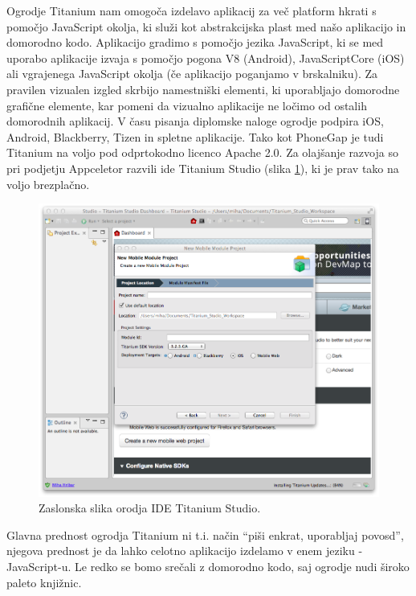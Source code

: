 Ogrodje Titanium\cite{titanium} nam omogoča izdelavo aplikacij za več platform hkrati s pomočjo JavaScript okolja, ki služi kot abstrakcijska plast med našo aplikacijo in domorodno kodo. Aplikacijo gradimo s pomočjo jezika JavaScript, ki se med uporabo aplikacije izvaja s pomočjo pogona V8\cite{v8} (Android), JavaScriptCore (iOS)\cite{javascriptcore} ali vgrajenega JavaScript okolja (če aplikacijo poganjamo v brskalniku). Za pravilen vizualen izgled skrbijo namestniški elementi, ki uporabljajo domorodne grafične elemente, kar pomeni da vizualno aplikacije ne ločimo od ostalih domorodnih aplikacij. V času pisanja diplomske naloge ogrodje podpira iOS, Android, Blackberry, Tizen in spletne aplikacije. Tako kot PhoneGap je tudi Titanium na voljo pod odprtokodno licenco Apache 2.0. Za olajšanje razvoja so pri podjetju Appceletor razvili \gls{ide} Titanium Studio (slika \ref{fig:titanium-studio}), ki je prav tako na voljo brezplačno.

\begin{figure}
 \includegraphics[width=\linewidth]{titanium}
 \caption{Zaslonska slika orodja IDE Titanium Studio.}
 \label{fig:titanium-studio}
\end{figure}

Glavna prednost ogrodja Titanium ni t.i. način ``piši enkrat, uporabljaj povosd'', njegova prednost je da lahko celotno aplikacijo izdelamo v enem jeziku - JavaScript-u. Le redko se bomo srečali z domorodno kodo, saj ogrodje nudi široko paleto knjižnic.

